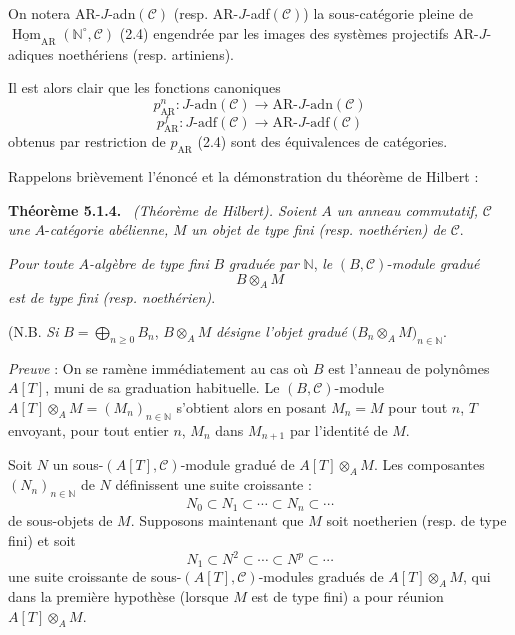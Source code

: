 \documentclass[11pt]{article}
\newenvironment{statement}[1]{\par\medskip\noindent\textbf{#1.}\ }{\par\medskip}
\DeclareMathOperator{\Hom}{Hom}
\providecommand{\uHom}{\underline{\Hom}}
\providecommand{\Hom}{\operatorname{Hom}}
\providecommand{\Hom}{\operatorname{Hom}}
\begin{document}
On notera AR-\(J\)-adn\((\mathcal C)\) (resp. AR-\(J\)-adf\((\mathcal C)\)) la sous-catégorie pleine de \(\uHom_{\mathrm{AR}}(\mathbb N^\circ,\mathcal C)\) (2.4) engendrée par les images des systèmes projectifs AR-\(J\)-adiques noethériens (resp. artiniens).

Il est alors clair que les fonctions canoniques
\[
p^n_{\mathrm{AR}}:J\text{-adn}(\mathcal C)\longrightarrow \mathrm{AR}\text{-}J\text{-adn}(\mathcal C)
\]
\[
p^f_{\mathrm{AR}}:J\text{-adf}(\mathcal C)\longrightarrow \mathrm{AR}\text{-}J\text{-adf}(\mathcal C)
\]
obtenus par restriction de \(p_{\mathrm{AR}}\) (2.4) sont des équivalences de catégories.

Rappelons brièvement l'énoncé et la démonstration du théorème de Hilbert :

\begin{statement}{Théorème 5.1.4}
\emph{(Théorème de Hilbert). Soient \(A\) un anneau commutatif,} \(\mathcal C\) \emph{une} \(A\)-\emph{catégorie abélienne,} \(M\) \emph{un objet de type fini (resp. noethérien) de} \(\mathcal C\).

\emph{Pour toute \(A\)-algèbre de type fini} \(B\) \emph{graduée par} \(\mathbb N\), \emph{le} \((B,\mathcal C)\)-\emph{module gradué}
\[
B\otimes_A M
\]
\emph{est de type fini} \emph{(resp. noethérien)}.

(N.B. \emph{Si} \(B=\bigoplus_{n\ge0}B_n\), \(B\otimes_A M\) \emph{désigne l'objet gradué} \(\bigl(B_n\otimes_A M\bigr)_{n\in\mathbb N}\).
\end{statement}

\emph{Preuve} : On se ramène immédiatement au cas où \(B\) est l'anneau de polynômes \(A[T]\), muni de sa graduation habituelle. Le \((B,\mathcal C)\)-module \(A[T]\otimes_A M=(M_n)_{n\in\mathbb N}\) s'obtient alors en posant \(M_n=M\) pour tout \(n\), \(T\) envoyant, pour tout entier \(n\), \(M_n\) dans \(M_{n+1}\) par l'identité de \(M\).

Soit \(N\) un sous-\((A[T],\mathcal C)\)-module gradué de \(A[T]\otimes_A M\). Les composantes \((N_n)_{n\in\mathbb N}\) de \(N\) définissent une suite croissante :
\[
N_0\subset N_1\subset\cdots\subset N_n\subset\cdots
\]
de
sous-objets de \(M\). Supposons maintenant que \(M\) soit noetherien (resp. de type fini) et soit
\[
N_1\subset N^2\subset\cdots\subset N^p\subset\cdots
\]
une suite croissante de sous-\((A[T],\mathcal C)\)-modules gradués de \(A[T]\otimes_A M\), qui dans la première hypothèse (lorsque \(M\) est de type fini) a pour réunion \(A[T]\otimes_A M\).
\end{document}
